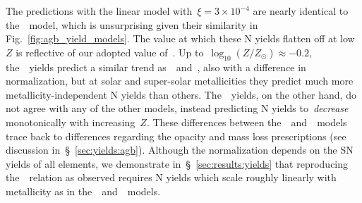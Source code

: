 \documentclass[ms.tex]{subfiles}
\begin{document}
The predictions with the linear model with~$\xi = 3\times10^{-4}$ are nearly
identical to the~\cristallo~model, which is unsurprising given their
similarity in Fig.~\ref{fig:agb_yield_models}.
The value at which these N yields flatten off at low~$Z$ is reflective of our
adopted value of~.
Up to~$\log_{10}(Z / Z_\odot) \approx -0.2$, the~\karakas~yields predict a
similar trend as~\cristallo~and~\ventura, also with a difference in
normalization, but at solar and super-solar metallicities they predict much
more metallicity-independent N yields than others.
The~\karakasten~yields, on the other hand, do not agree with any of the other
models, instead predicting N yields to~\textit{decrease} monotonically with
increasing~$Z$.
These differences between the~\karakasten~and~\karakas~models trace back to
differences regarding the opacity and mass loss prescriptions (see discussion
in~\S~\ref{sec:yields:agb}).
Although the normalization depends on the SN yields of all elements, we
demonstrate in~\S~\ref{sec:results:yields} that reproducing the~\ohno~relation
as observed requires N yields which scale roughly linearly with metallicity as
in the~\cristallo~and~\ventura~models.
\end{document}
